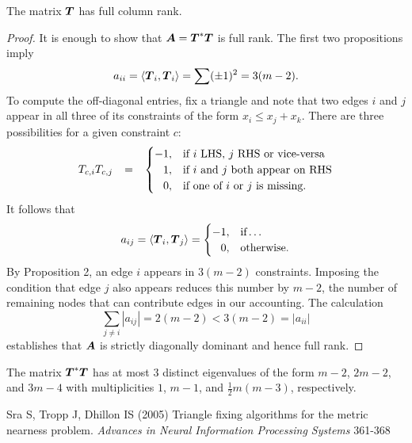 \documentclass{article}
\begin{document}
\begin{proposition}
    The matrix \(\boldsymbol{T}\) has full column rank.
\end{proposition}
\begin{proof}
    It is enough to show that \(\boldsymbol{A} = \boldsymbol{T}^{\ast}\boldsymbol{T}\) is full rank.
    The first two propositions imply
    \begin{equation*}
        a_{ii}
        =
        \langle{\boldsymbol{T}_{i}, \boldsymbol{T}_{i}}\rangle
        =
        \sum (\pm 1)^{2}
        =
        3 (m-2).
    \end{equation*}
    To compute the off-diagonal entries, fix a triangle and note that two edges \(i\) and \(j\) appear in all three of its constraints of the form \(x_{i} \le x_{j} + x_{k}\).
    There are three possibilities for a given constraint \(c\):
    \begin{equation*}
        T_{c,i} T_{c,j} \mathop{\:\:\,}\nolimits = \mathop{\:\:\,}\nolimits
        \begin{cases}
            -1, &\text{if \(i\) LHS, \(j\) RHS or vice-versa} \\
            \mathop{\:\:\,}\nolimits 1,  &\text{if \(i\) and \(j\) both appear on RHS} \\
            \mathop{\:\:\,}\nolimits 0,  &\text{if one of \(i\) or \(j\) is missing}.
        \end{cases}
    \end{equation*}
    It follows that
    \begin{equation*}
        a_{ij}
        =
        \langle{\boldsymbol{T}_{i}, \boldsymbol{T}_{j}}\rangle
        =
        \begin{cases}
            -1, &\text{if}\ldots \\
            \mathop{\:\:\,}\nolimits 0, &\text{otherwise}.
        \end{cases}
    \end{equation*}
    By Proposition 2, an edge \(i\) appears in \(3 (m-2)\) constraints.
    Imposing the condition that edge \(j\) also appears reduces this number by \(m-2\), the number of remaining nodes that can contribute edges in our accounting.
    The calculation
    \begin{equation*}
        \sum_{j \neq i} |a_{ij}| = 2 (m-2) < 3 (m-2) = |a_{ii}|
    \end{equation*}
    establishes that \(\boldsymbol{A}\) is strictly diagonally dominant and hence full rank.
\end{proof}

\begin{proposition}
    The matrix \(\boldsymbol{T}^{\ast}\boldsymbol{T}\) has at most \(3\) distinct eigenvalues of the form \(m-2\), \(2m-2\), and \(3m-4\) with multiplicities \(1\), \(m-1\), and \(\frac{1}{2} m (m-3)\), respectively.
\end{proposition}

\begin{thebibliography}{99}
    Sra S, Tropp J, Dhillon IS (2005) {Triangle fixing algorithms for the metric nearness problem}. {\it Advances in Neural Information Processing Systems} 361-368
\end{thebibliography}
\end{document}
